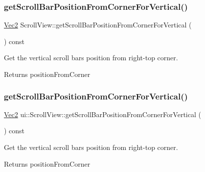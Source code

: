 \subsubsection{\texorpdfstring{get\+Scroll\+Bar\+Position\+From\+Corner\+For\+Vertical()}{getScrollBarPositionFromCornerForVertical()}\hspace{0.1cm}{\footnotesize\ttfamily [1/2]}}
{\footnotesize\ttfamily \hyperlink{classVec2}{Vec2} Scroll\+View\+::get\+Scroll\+Bar\+Position\+From\+Corner\+For\+Vertical (\begin{DoxyParamCaption}{ }\end{DoxyParamCaption}) const}



Get the vertical scroll bar\textquotesingle{}s position from right-\/top corner. 

\begin{DoxyReturn}{Returns}
position\+From\+Corner 
\end{DoxyReturn}
\mbox{\label{classui_1_1ScrollView_a906ca15a2925ad9bd9221e48a927cee8}} 
\subsubsection{\texorpdfstring{get\+Scroll\+Bar\+Position\+From\+Corner\+For\+Vertical()}{getScrollBarPositionFromCornerForVertical()}\hspace{0.1cm}{\footnotesize\ttfamily [2/2]}}
{\footnotesize\ttfamily \hyperlink{classVec2}{Vec2} ui\+::\+Scroll\+View\+::get\+Scroll\+Bar\+Position\+From\+Corner\+For\+Vertical (\begin{DoxyParamCaption}{ }\end{DoxyParamCaption}) const}



Get the vertical scroll bar\textquotesingle{}s position from right-\/top corner. 

\begin{DoxyReturn}{Returns}
position\+From\+Corner 
\end{DoxyReturn}
\mbox{\label{classui_1_1ScrollView_ab01395ff7e8d6d108939361624766408}} 
